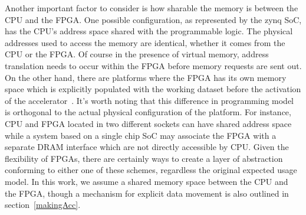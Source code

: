 Another important factor to consider is how sharable the memory
is between the CPU and the FPGA. 
One possible configuration, as represented by the zynq SoC, has
the CPU's address space shared with the programmable logic.
The physical addresses used to access the memory are identical,
whether it comes from the CPU or the FPGA. Of course in the presence
of virtual memory, address translation needs to occur within the FPGA
before memory requests are sent out. On the other hand, there are
platforms where the FPGA has its own memory space which is
explicitly populated with the working dataset before the activation of 
the accelerator~\cite{sdaccel}. It's worth noting that this difference in programming model
is orthogonal to the actual physical configuration of the platform. For instance, CPU and FPGA located in two different sockets can have shared address space while a system based on a single chip SoC may associate the FPGA with a separate DRAM interface which are not directly
accessible by CPU. 
Given the flexibility of FPGAs, there are certainly ways to create a layer of abstraction conforming to either one of these schemes, regardless
the original expected usage model. 
In this work, we assume a shared memory space between the CPU and the FPGA, 
though a mechanism for explicit data movement is also outlined in section~\ref{makingAcc}.





